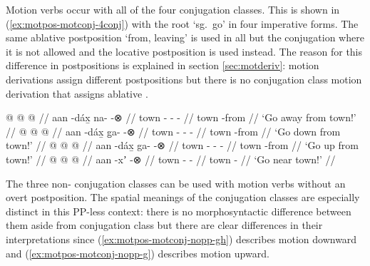 \documentclass[12pt,letterpaper,oneside,article]{memoir}
\begin{document}
Motion verbs occur with all of the four conjugation classes.
This is shown in (\ref{ex:motpos-motconj-4conj}) with the root  ‘sg.\ go’ in four imperative forms.
The same ablative postposition  ‘from, leaving’ is used in all but the  conjugation where it is not allowed and the locative postposition  is used instead.
The reason for this difference in postpositions is explained in section \ref{sec:motderiv}: motion derivations assign different postpositions but there is no  conjugation class motion derivation that assigns ablative .

\pex\label{ex:motpos-motconj-4conj}%
\a\label{ex:motpos-motconj-4conj-n}%
%
\begingl
	\gla	{} @ {}  @ {} @ {} //
	\glb	aan -dáx̱ na-  -⊗ //
	\glc	town - -  - //
	\gld	town -from  {} {} //
	\glft	‘Go away from town!’
		//
\endgl
\a\label{ex:motpos-motconj-4conj-gh}%
%
\begingl
	\gla	{} @ {}  @ {} @ {} //
	\glb	aan -dáx̱ g̱a-  -⊗ //
	\glc	town - -  - //
	\gld	town -from  {} {} //
	\glft	‘Go down from town!’
		//
\endgl
\a\label{ex:motpos-motconj-4conj-g}%
%
\begingl
	\gla	{} @ {}  @ {} @ {} //
	\glb	aan -dáx̱ ga-  -⊗ //
	\glc	town - -  - //
	\gld	town -from  {} {} //
	\glft	‘Go up from town!’
		//
\endgl
\a\label{ex:motpos-motconj-4conj-z}%
%
\begingl
	\gla	{} @ {}  @ {} @ {}//
	\glb	aan -xʼ {}  -⊗ //
	\glc	town - \·  - //
	\gld	town -\phantom{from}  {} {} //
	\glft	‘Go near town!’
		//
\endgl
\xe

The three non- conjugation classes can be used with motion verbs without an overt postposition.
The spatial meanings of the conjugation classes \parencite[583–586]{crippen:2019} are especially distinct in this PP-less context: there is no morphosyntactic difference between them aside from conjugation class but there are clear differences in their interpretations since (\ref{ex:motpos-motconj-nopp-gh}) describes motion downward  and (\ref{ex:motpos-motconj-nopp-g}) describes motion upward.
\end{document}
